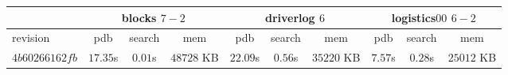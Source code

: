 \documentclass[a4paper,12pt]{scrartcl}
\begin{document}
\begin{tabular}{|l|c|c|c|c|c|c|c|c|c|}\hline
& \multicolumn{3}{c|}{blocks $7-2$} & \multicolumn{3}{c|}{driverlog $6$} & \multicolumn{3}{c|}{logistics$00$ $6-2$}\\\hline
revision & pdb & search & mem & pdb & search & mem & pdb & search & mem\\\hline
$4b60266162fb$ & $17.35$s & $0.01$s & $48728$ KB & $22.09$s & $0.56$s & $35220$ KB & $7.57$s & $0.28$s & $25012$ KB\\\hline
\end{tabular}
\end{document}
